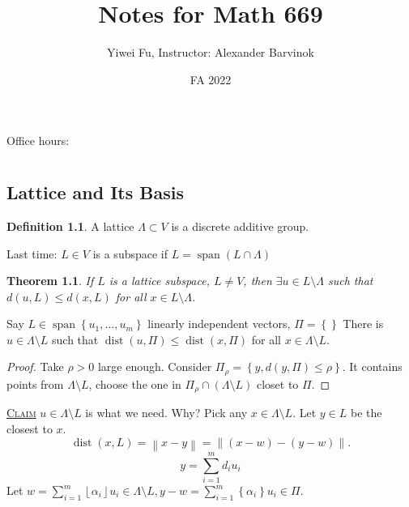 \documentclass{report}
\def \dist {\operatorname{dist}}
\def \dist {\operatorname{dist}}
\newcommand{\norm}[1]{\left\| #1 \right\|}
\newcommand{\floor}[1]{\left\lfloor #1 \right\rfloor}
\newcommand{\set}[1]{\left\{ #1 \right\}}
\newcommand{\fancyem}[1]{\underline{\textsc{#1}}}
\newtheorem{theorem}{Theorem}[section]
\theoremstyle{definition}
\newtheorem{definition}{Definition}[section]
\theoremstyle{remark}
\numberwithin{equation}{section}
\begin{document}
\title{Notes for Math 669}
\author{Yiwei Fu, Instructor: Alexander Barvinok}
\date{FA 2022}
\maketitle


\tableofcontents
Office hours: 

\clearpage
{}


\chapter{}

\section{Lattice and Its Basis}
\begin{definition}
    A lattice $\Lambda \subset V$ is a discrete additive group.
\end{definition}

Last time: $L \in V$ is a subspace if $L = \operatorname{span} (L \cap \Lambda)$

\begin{theorem}
    If $L$ is a lattice subspace, $L \neq V$, then $\exists u \in L \setminus \Lambda$ such that $d(u, L) \leq d(x, L)$ for all $x \in L \setminus \Lambda$.
\end{theorem}

Say $L \in \operatorname{span}\left\{u_1, \ldots, u_m\right\}$ linearly independent vectors, $\Pi = \left\{\right\}$ There is $u \in \Lambda \setminus L$ such that $\dist(u, \Pi) \leq \dist(x, \Pi)$ for all $x \in \Lambda \setminus L$. 
\begin{proof}
    Take $\rho > 0$ large enough. Consider $\Pi_\rho = \left\{y, d(y, \Pi) \leq \rho\right\}$. It contains points from $\Lambda \setminus L$, choose the one in $\Pi_\rho \cap (\Lambda \setminus L)$ closet to $\Pi$.
\end{proof}
\fancyem{Claim} $u \in \Lambda \setminus L$ is what we need. Why?
Pick any $x \in \Lambda \setminus L$. Let $y \in L$ be the closest to $x$. 
\[\dist(x, L) = \norm{x - y} = \norm{(x - w) - (y - w)}.\]
\[y = \sum_{i=1}^m d_iu_i\]
Let $w = \sum_{i=1}^m \floor{\alpha_i}u_i \in \Lambda \setminus L, y - w = \sum_{i=1}^m \set{\alpha_i}u_i \in \Pi$. 
\end{document}
